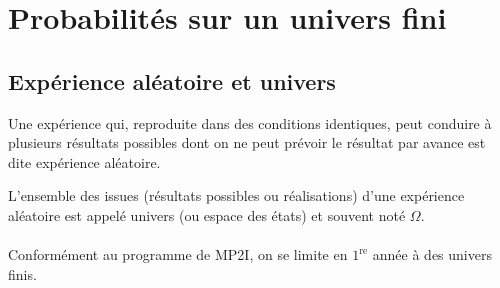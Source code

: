 \section{Probabilités sur un univers fini}
\subsection{Expérience aléatoire et univers}
\begin{defprop}
    Une expérience qui, reproduite dans des conditions identiques, peut conduire à plusieurs résultats possibles dont on ne peut prévoir le résultat par avance est dite expérience aléatoire.
\end{defprop}
\begin{defprop}[Univers]
    L’ensemble des issues (résultats possibles ou réalisations) d’une expérience aléatoire est appelé univers (ou espace des états) et souvent noté \(\Omega\). \\~\\
    Conformément au programme de MP2I, on se limite en \(1^{\text{re}}\) année à des univers finis.
\end{defprop}
